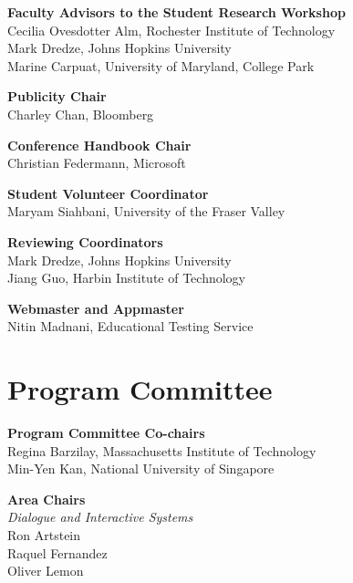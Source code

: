 {\bf Faculty Advisors to the Student Research Workshop} \\
\hspace*{0.2in} Cecilia Ovesdotter Alm, Rochester Institute of Technology \\
\hspace*{0.2in} Mark Dredze, Johns Hopkins University \\
\hspace*{0.2in} Marine Carpuat, University of Maryland, College Park

{\bf Publicity Chair} \\
Charley Chan, Bloomberg

{\bf Conference Handbook Chair} \\
Christian Federmann, Microsoft

{\bf Student Volunteer Coordinator} \\
Maryam Siahbani, University of the Fraser Valley

{\bf Reviewing Coordinators} \\
Mark Dredze, Johns Hopkins University \\
Jiang Guo, Harbin Institute of Technology

{\bf Webmaster and Appmaster} \\
Nitin Madnani, Educational Testing Service


\clearpage
\section{Program Committee}
\setlength{\parindent}{0pt}

\vspace*{0.5cm}

{\bf Program Committee Co-chairs} \\
Regina Barzilay, Massachusetts Institute of Technology \\
Min-Yen Kan, National University of Singapore

{\bf Area Chairs} \\
\emph{Dialogue and Interactive Systems} \\
\hspace*{0.2in} Ron Artstein \\
\hspace*{0.2in} Raquel Fernandez \\
\hspace*{0.2in} Oliver Lemon

